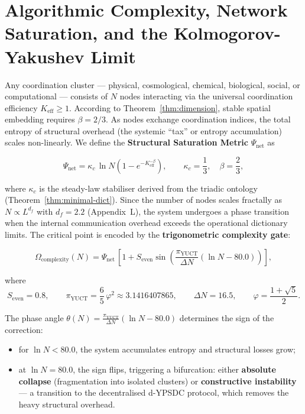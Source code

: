 \documentclass[12pt,a4paper]{article}
\theoremstyle{remark}
\newcommand{\Keff}{K_{\mathrm{eff}}}
\newcommand{\kappac}{\kappa_c}
\newcommand{\Seven}{S_{\mathrm{even}}}
\newcommand{\piYUCT}{\pi_{\mathrm{YUCT}}}
\begin{document}
	\sloppy
	\section{Algorithmic Complexity, Network Saturation, and the Kolmogorov-Yakushev Limit}
	\label{sec:complexity}
	
	Any coordination cluster --- physical, cosmological, chemical, biological, social, or computational --- consists of \(N\) nodes interacting via the universal coordination efficiency \(\Keff \ge 1\). According to Theorem~\ref{thm:dimension}, stable spatial embedding requires \(\beta = 2/3\). As nodes exchange coordination indices, the total entropy of structural overhead (the systemic ``tax'' or entropy accumulation) scales non-linearly. We define the \textbf{Structural Saturation Metric} \(\Psi_{\mathrm{net}}\) as
	
	\begin{equation}
		\Psi_{\mathrm{net}} = \kappac \, \ln N \left(1 - e^{-\Keff^{-\beta}}\right),
		\qquad \kappac = \frac{1}{3},\quad \beta = \frac{2}{3},
		\label{eq:Psi_net}
	\end{equation}
	
	where \(\kappac\) is the steady-law stabiliser derived from the triadic ontology (Theorem~\ref{thm:minimal-dict}). Since the number of nodes scales fractally as \(N \propto L^{d_f}\) with \(d_f = 2.2\) (Appendix~L), the system undergoes a phase transition when the internal communication overhead exceeds the operational dictionary limits. The critical point is encoded by the \textbf{trigonometric complexity gate}:
	
	\begin{equation}
		\Omega_{\mathrm{complexity}}(N) = \Psi_{\mathrm{net}} \,
		\left[1 + \Seven \sin\!\left( \frac{\piYUCT}{\Delta N} \left(\ln N - 80.0\right) \right) \right],
		\label{eq:Omega_complexity}
	\end{equation}
	
	where
	\[
	\Seven = 0.8,\qquad
	\piYUCT = \frac{6}{5}\,\varphi^2 \approx 3.1416407865,\qquad
	\Delta N = 16.5,\qquad
	\varphi = \frac{1+\sqrt{5}}{2}.
	\]
	
	The phase angle \(\theta(N) = \frac{\piYUCT}{\Delta N} (\ln N - 80.0)\) determines the sign of the correction:
	\begin{itemize}
		\item for \(\ln N < 80.0\), the system accumulates entropy and structural losses grow;
		\item at \(\ln N = 80.0\), the sign flips, triggering a bifurcation: either \textbf{absolute collapse} (fragmentation into isolated clusters) or \textbf{constructive instability} --- a transition to the decentralised d-YPSDC protocol, which removes the heavy structural overhead.
	\end{itemize}
	
\end{document}
